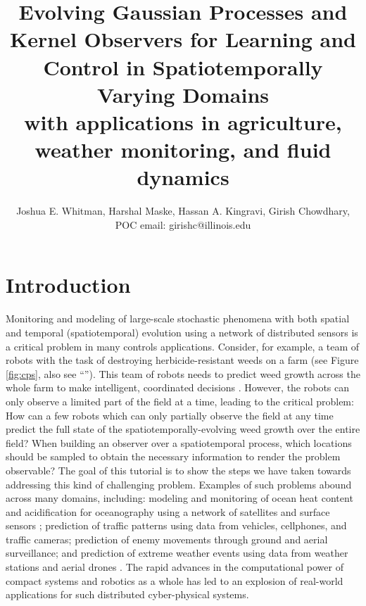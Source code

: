 \documentclass[letterpaper,12pt,peerreviewca,draftcls]{IEEEtran}
\title{Evolving Gaussian Processes and Kernel Observers for Learning and Control in Spatiotemporally Varying Domains\\\Large with applications in agriculture, weather monitoring, and fluid dynamics}
\author{Joshua E. Whitman, Harshal Maske, Hassan A. Kingravi, Girish Chowdhary, \\ POC email: girishc@illinois.edu}
\begin{document}
\maketitle
\CSMsetup
\linenumbers \modulolinenumbers[5] %




%

\section{Introduction} \label{sec:intro}
Monitoring and modeling of large-scale stochastic phenomena with both spatial and temporal (spatiotemporal) evolution using a network of distributed sensors is a critical problem in many controls applications. Consider, for example, a team of robots with the task of destroying herbicide-resistant weeds on a farm (see Figure \ref{fig:cps}, also see ``''). This team of robots needs to predict weed growth across the whole farm  to make intelligent, coordinated decisions \cite{McAllistar18IROS}. However, the robots can only observe a limited part of the field at a time, leading to the critical problem: How can a few robots which can only partially observe the field at any time predict the full state of the spatiotemporally-evolving weed growth over the entire field? When building an observer over a spatiotemporal process, which locations should be sampled to obtain the necessary information to render the problem observable? The goal of this tutorial is to show the steps we have taken towards addressing this kind of challenging problem. Examples of such problems abound across many domains, including: modeling and monitoring of ocean heat content and acidification for oceanography using a network of satellites and surface sensors \cite{barnett2001detection}; prediction of traffic patterns using data from vehicles, cellphones, and traffic cameras; prediction of enemy movements through ground and aerial surveillance; and prediction of extreme weather events using data from weather stations and aerial drones \cite{heaton2011spatio}. The rapid advances in the computational power of compact systems and robotics as a whole has led to an explosion of real-world applications for such distributed cyber-physical systems. 
 
\end{document}
